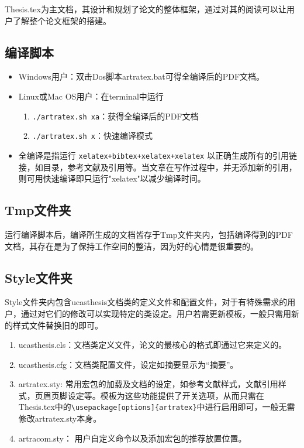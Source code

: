 Thesis.tex为主文档，其设计和规划了论文的整体框架，通过对其的阅读可以让用户了解整个论文框架的搭建。

\subsection{编译脚本}

\begin{itemize}
    \item Windows用户：双击Dos脚本artratex.bat可得全编译后的PDF文档。
    \item Linux或Mac OS用户：在terminal中运行
        \begin{enumerate}
            \item \verb|./artratex.sh xa|：获得全编译后的PDF文档
            \item \verb|./artratex.sh x|：快速编译模式
        \end{enumerate}
    \item 全编译是指运行 \verb|xelatex+bibtex+xelatex+xelatex| 以正确生成所有的引用链接，如目录，参考文献及引用等。当文章在写作过程中，并无添加新的引用，则可用快速编译即只运行"xelatex"以减少编译时间。
\end{itemize}


\subsection{Tmp文件夹}

运行编译脚本后，编译所生成的文档皆存于Tmp文件夹内，包括编译得到的PDF文档，其存在是为了保持工作空间的整洁，因为好的心情是很重要的。

\subsection{Style文件夹}

Style文件夹内包含ucasthesis文档类的定义文件和配置文件，对于有特殊需求的用户，通过对它们的修改可以实现特定的类设定。用户若需更新模板，一般只需用新的样式文件替换旧的即可。

\begin{enumerate}
  \item ucasthesis.cls：文档类定义文件，论文的最核心的格式即通过它来定义的。
  \item ucasthesis.cfg：文档类配置文件，设定如摘要显示为“摘要”。
  \item artratex.sty: 常用宏包的加载及文档的设定，如参考文献样式，文献引用样式，页眉页脚设定等。模板为这些功能提供了开关选项，从而只需在Thesis.tex中的\verb+\usepackage[options]{artratex}+中进行启用即可，一般无需修改artratex.sty本身。
  \item artracom.sty： 用户自定义命令以及添加宏包的推荐放置位置。
\end{enumerate}

